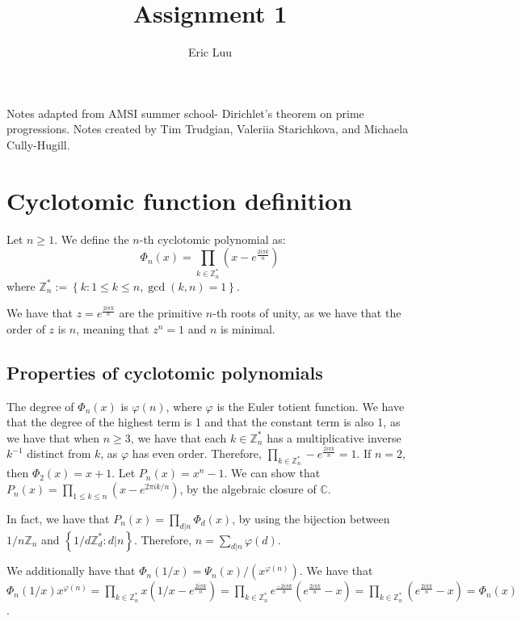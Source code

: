 \documentclass[]{article}
\title{Assignment 1}
\author{Eric Luu}
\begin{document}
Notes adapted from AMSI summer school- Dirichlet's theorem on prime progressions. 
Notes created by Tim Trudgian, Valeriia Starichkova, and Michaela Cully-Hugill.
\maketitle
\section{Cyclotomic function definition}
Let $n \geq 1$. We define the $n$-th cyclotomic polynomial as:
\begin{equation}
	\Phi_n(x) = \prod_{k \in \mathbb{Z}_n^*}\left(x - e^{\frac{2 i \pi k}{n}}\right)
\end{equation}
where $\mathbb{Z}_n^* := \left\lbrace k : 1 \leq k \leq n, \gcd(k, n) = 1 \right\rbrace$. 

We have that $z = e^{\frac{2 i \pi k}{n}}$ are the primitive $n$-th roots of unity, as we have that the order of $z$ is $n$, meaning that $z^n = 1$ and $n$ is minimal.

\subsection{Properties of cyclotomic polynomials}
The degree of $\Phi_n(x)$ is $\varphi(n)$, where $\varphi$ is the Euler totient function. 
We have that the degree of the highest term is 1 and that the constant term is also 1, as we have that when $n \geq 3$, we have that each $k \in \mathbb{Z}_n^*$ has a multiplicative inverse $k^{-1}$ distinct from $k$, as $\varphi$ has even order. Therefore, $\prod_{k \in \mathbb{Z}^*_n} - e^{\frac{2 i \pi k}{n}} = 1$. If $n = 2$, then $\Phi_2(x) = x + 1$. 
Let $P_n(x) = x^n - 1$. We can show that $P_n(x) = \prod_{1 \leq k \leq n} \left( x - e^{2 \pi i k/n} \right)$, by the algebraic closure of $\mathbb{C}$. 

In fact, we have that $P_n(x) = \prod_{d|n} \Phi_d(x)$, by using the bijection between $1/n \mathbb{Z}_n$ and $\left\lbrace 1/d \mathbb{Z}_d^* : d | n \right\rbrace$. Therefore, $n = \sum_{d | n} \varphi(d)$. 

We additionally have that $\Phi_n(1/x) = \Psi_n(x)/(x^{\varphi(n)})$.
We have that
$\Phi_n(1/x) x^{\varphi(n)} = \prod_{k \in \mathbb{Z}_n^*}x\left(1/x - e^{\frac{2 i \pi k}{n}}\right) = \prod_{k \in \mathbb{Z}_n^*} e^{\frac{-2 i \pi k}{n}} \left(e^{\frac{2 i \pi k}{n}} - x\right) = \prod_{k \in \mathbb{Z}_n^*} \left(e^{\frac{2 i \pi k}{n}} - x\right) = \Phi_n(x)$.
\end{document}
